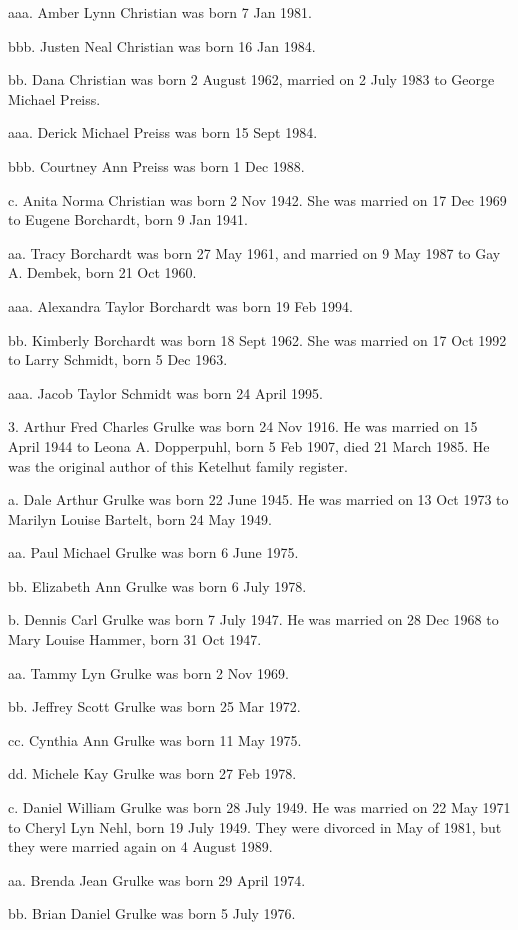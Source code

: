 \documentclass[a4paper]{article}
\begin{document}
aaa. Amber Lynn Christian was born 7 Jan 1981.

bbb. Justen Neal Christian was born 16 Jan 1984.

bb. Dana Christian was born 2 August 1962, married on 2 July 1983 to George Michael Preiss.

aaa. Derick Michael Preiss was born 15 Sept 1984.

bbb. Courtney Ann Preiss was born 1 Dec 1988.

c. Anita Norma Christian was born 2 Nov 1942.  She was married on 17 Dec 1969 to Eugene Borchardt, born 9 Jan 1941. 

aa. Tracy Borchardt was born 27 May 1961,  and married on 9 May 1987 to Gay A. Dembek, born 21 Oct 1960.

aaa. Alexandra Taylor Borchardt was born 19 Feb 1994.

bb. Kimberly Borchardt was born 18 Sept 1962.  She was married on 17 Oct 1992 to Larry Schmidt, born 5 Dec 1963.

aaa. Jacob Taylor Schmidt was born 24 April 1995.

3.  Arthur Fred Charles Grulke was born 24 Nov 1916.  He was married on 15 April 1944 to Leona A. Dopperpuhl, born 5 Feb 1907, died 21 March 1985.  He was the original author of this Ketelhut family register.

a. Dale Arthur Grulke was born 22 June 1945.  He was married on 13 Oct 1973 to Marilyn Louise Bartelt, born 24 May 1949.

aa. Paul Michael Grulke was born 6 June 1975.

bb. Elizabeth Ann Grulke was born 6 July 1978.

b. Dennis Carl Grulke was born 7 July 1947.   He was married on 28 Dec 1968 to Mary Louise Hammer, born 31 Oct 1947.

aa. Tammy Lyn Grulke was born 2 Nov 1969.

bb. Jeffrey Scott Grulke was born 25 Mar 1972.

cc. Cynthia Ann Grulke was born 11 May 1975.

dd. Michele Kay Grulke was born 27 Feb 1978.

c. Daniel William Grulke was born 28 July 1949.  He was married on 22 May 1971 to Cheryl Lyn Nehl, born 19 July 1949.  They were divorced in May of 1981, but they were married again on 4 August 1989.  

aa. Brenda Jean Grulke was born 29 April 1974.

bb. Brian Daniel Grulke was born 5 July 1976.
\end{document}
